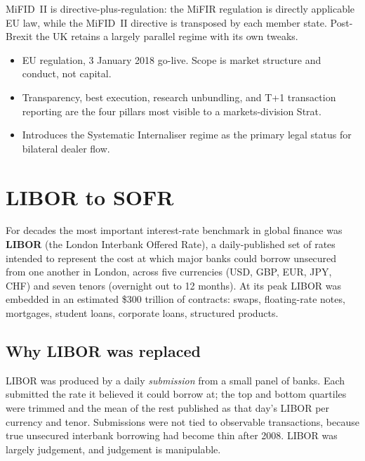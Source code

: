 MiFID~II is directive-plus-regulation: the MiFIR regulation is
directly applicable EU law, while the MiFID~II directive is
transposed by each member state.  Post-Brexit the UK retains a
largely parallel regime with its own tweaks.

\begin{keyfactbox}
\begin{itemize}
  \item EU regulation, 3 January 2018 go-live.  Scope is
    market structure and conduct, not capital.
  \item Transparency, best execution, research unbundling,
    and T+1 transaction reporting are the four pillars most
    visible to a markets-division Strat.
  \item Introduces the Systematic Internaliser regime as the
    primary legal status for bilateral dealer flow.
\end{itemize}
\end{keyfactbox}


\section{LIBOR to SOFR}
\label{sec:libor_sofr}

For decades the most important interest-rate benchmark in global
finance was \textbf{LIBOR} (the London Interbank Offered Rate),
a daily-published set of rates intended to represent the cost
at which major banks could borrow unsecured from one another in
London, across five currencies (USD, GBP, EUR, JPY, CHF) and
seven tenors (overnight out to 12 months).  At its peak LIBOR was
embedded in an estimated \$300 trillion of contracts: swaps,
floating-rate notes, mortgages, student loans, corporate loans,
structured products.

\subsection{Why LIBOR was replaced}

LIBOR was produced by a daily \emph{submission} from a small
panel of banks.  Each submitted the rate it believed it could
borrow at; the top and bottom quartiles were trimmed and the mean
of the rest published as that day's LIBOR per currency and tenor.
Submissions were not tied to observable transactions, because
true unsecured interbank borrowing had become thin after 2008.
LIBOR was largely judgement, and judgement is manipulable.

